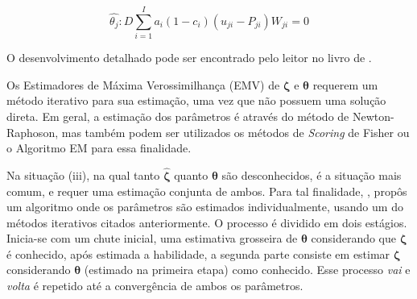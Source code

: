 \[ \hat{\theta_j} : D\sum_{i=1}^{I}{a_i(1-c_i)(u_{ji}-P_{ji})W_{ji}} = 0  \] 

O desenvolvimento detalhado pode ser encontrado pelo leitor no livro de .

Os Estimadores de Máxima Verossimilhança (EMV) de $ \boldsymbol{\zeta} $ e $ \boldsymbol{\theta} $ requerem um método iterativo para sua estimação, uma vez que não possuem uma solução direta. Em geral, a estimação dos parâmetros é através do método de Newton-Raphoson, mas também podem ser utilizados os métodos de \textit{Scoring} de Fisher ou o Algoritmo EM para essa finalidade.

\begin{comment}
 \citeonline{de2000teoria}. Sendo assim, considerando $\boldsymbol{\hat{\zeta}}^{(t)}_{i}$
uma estimativa de $\boldsymbol{\hat{\zeta}}$ na iteração $t$, o procedimento de
Newton-Raphson é dado por:\\

\noindent $ \boldsymbol{\hat{\zeta}}^{(t+1)}_{i} = \boldsymbol{\hat{\zeta}}^{(t)}_{i} + [\bold{H}(\boldsymbol{\hat{\zeta}}^{(t)})]^{-1}\bold{h}({\boldsymbol{\hat{\zeta}}^{(t)}})
$, onde $\bold{H}$ representa a matriz Hessiana.\\
\end{comment}


Na situação (iii), na qual tanto $ \boldsymbol{\hat{\zeta}} $ quanto $ \boldsymbol{\theta} $ são desconhecidos, é a situação mais comum, e requer uma estimação conjunta de ambos.
Para tal finalidade, , propôs um algoritmo onde os parâmetros são estimados individualmente, usando um do métodos iterativos citados anteriormente.
O processo é dividido em dois estágios. Inicia-se com um chute inicial, uma estimativa grosseira de $ \boldsymbol{\theta} $ considerando que $ \boldsymbol{\zeta} $ é conhecido, após estimada a habilidade, a segunda parte consiste em estimar $ \boldsymbol{\zeta} $ considerando $ \boldsymbol{\theta} $ (estimado na primeira etapa) como conhecido. Esse processo \textit{vai} e \textit{volta} é repetido até a convergência de ambos os parâmetros.



\begin{comment}
Além do método de Estimação de Máxima Verossimilhança (EMV), existem outros métodos de estimação dos parâmetros, que são frequentemente utilizados em contextos de avaliação educacional, estes incluem:
\end{comment}

